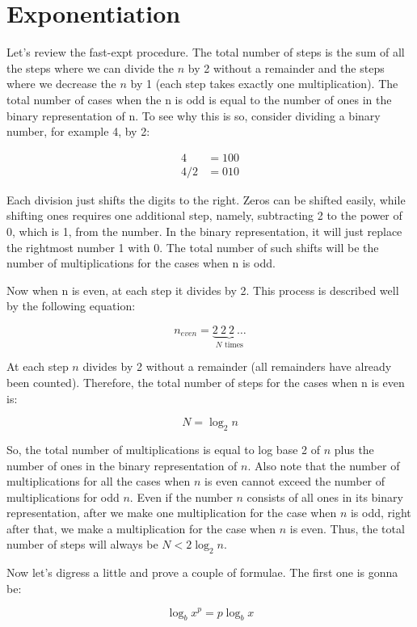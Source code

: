 \section*{Exponentiation}

Let's review the fast-expt procedure. The total number of steps is the sum of all the steps where we can divide the $n$ by 2 without a remainder and the steps where we decrease the $n$ by 1 (each step takes exactly one multiplication).  The total number of cases when the n is odd is equal to the number of ones in the binary representation of n. To see why this is so, consider dividing a binary number, for example 4, by 2:

\begin{align*}
4& = 100\\
4 / 2&  = 010
\end{align*}

Each division just shifts the digits to the right. Zeros can be shifted easily, while shifting ones requires one additional step, namely, subtracting 2 to the power of 0, which is 1, from the number. In the binary representation, it will just replace the rightmost number 1 with 0. The total number of such shifts will be the number of multiplications for the cases when n is odd.

Now when n is even, at each step it divides by 2. This process is described well by the following equation:

\[
n_{even} = \underbrace{2\ 2\ 2\ \dots}_\text{$N$ times}
\]

At each step $n$ divides by 2 without a remainder (all remainders have already been counted). Therefore, the total number of steps for the cases when n is even is:

\[
N = \log_2 n
\]

So, the total number of multiplications is equal to log base 2 of $n$ plus the number of ones in the binary representation of $n$. Also note that the number of multiplications for all the cases when $n$ is even cannot exceed the number of multiplications for odd $n$. Even if the number $n$ consists of all ones in its binary representation, after we make one multiplication for the case when $n$ is odd, right after that, we make a multiplication for the case when $n$ is even. Thus, the total number of steps will always be $N < 2 \log_2 n$.

Now let's digress a little and prove a couple of formulae. The first one is gonna be:

\[
\log_b x^p = p \log_b x
\]

